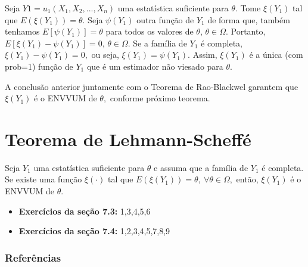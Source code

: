 \documentclass[12pt]{beamer}
\begin{document}
\begin{frame}{}
\begin{block}{}
\justifying
Seja $Y1 = u_{1}(X_1,X_2, . . .,X_n)$ uma estatística suficiente para $\theta.$ Tome $\xi(Y_{1})$ tal que $E(\xi(Y_{1}))=\theta.$ Seja $\psi(Y_1)$ outra função de $Y_1$ de forma que, também tenhamos $E[\psi(Y_1)] = \theta$ para todos os valores de $\theta$, $\theta \in \Omega$. Portanto,
$E[\xi(Y_1) - \psi(Y_1)] = 0$, $\theta \in \Omega$. Se a família de $Y_{1}$ é completa, $\xi(Y_1) - \psi(Y_1)=0,$ ou seja, $\xi(Y_1) = \psi(Y_1).$ Assim, $\xi(Y_{1})$ é a única (com prob=1) função de $Y_{1}$ que é um estimador não viesado para $\theta.$
\end{block}
\pause
\begin{block}{}
\justifying
A conclusão anterior juntamente com o Teorema de Rao-Blackwel garantem que $\xi(Y_{1})$ é o ENVVUM de $\theta,$ conforme próximo teorema. 
\end{block}
\end{frame}

\section{Teorema de Lehmann-Scheffé}
\begin{frame}{}
\begin{Teorema}
\justifying
Seja $Y_{1}$ uma estatística suficiente para $\theta$ e assuma que a família de $Y_{1}$ é completa. Se existe uma função $\xi(\cdot)$ tal que $E(\xi(Y_{1}))=\theta,~\forall \theta\in \Omega,$ então, $\xi(Y_{1})$ é o ENVVUM de $\theta.$
\end{Teorema}
\end{frame}

\begin{frame}{}
\begin{block}{\Home}
\justifying
\begin{itemize}
    \item \textbf{Exercícios da seção 7.3:} 1,3,4,5,6
    \item \textbf{Exercícios da seção 7.4:} 1,2,3,4,5,7,8,9
\end{itemize}
\nocite{hogg, casella2021statistical, bolfarine}
\end{block}
\end{frame}


\begin{frame}[allowframebreaks]
\frametitle{\bf Referências}
\printbibliography
\end{frame}
\end{document}
